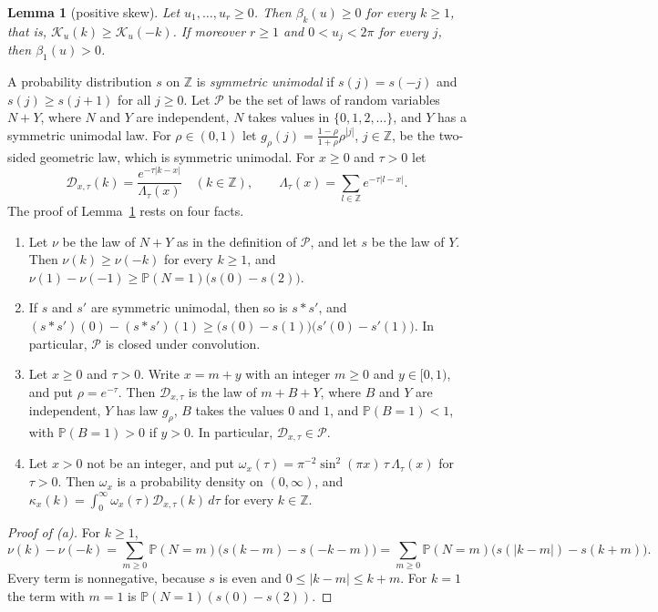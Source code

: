 \documentclass[11pt]{amsart}
\newtheorem{lemma}[theorem]{Lemma}
\theoremstyle{remark}
\numberwithin{equation}{section}
\renewcommand{\P}{\mathbb{P}}
\begin{document}
\begin{lemma}[positive skew]\label{B:lem:skew}
Let $u_1,\dots,u_r\ge0$. Then $\beta_k(u)\ge0$ for every $k\ge1$, that is, $\mathcal K_u(k)\ge\mathcal K_u(-k)$. If moreover $r\ge1$ and $0<u_j<2\pi$ for every $j$, then $\beta_1(u)>0$.
\end{lemma}

A probability distribution $s$ on $\mathbb Z$ is \emph{symmetric unimodal} if $s(j)=s(-j)$ and $s(j)\ge s(j+1)$ for all $j\ge0$. Let $\mathcal P$ be the set of laws of random variables $N+Y$, where $N$ and $Y$ are independent, $N$ takes values in $\{0,1,2,\dots\}$, and $Y$ has a symmetric unimodal law. For $\rho\in(0,1)$ let $g_\rho(j)=\frac{1-\rho}{1+\rho}\rho^{|j|}$, $j\in\mathbb Z$, be the two-sided geometric law, which is symmetric unimodal. For $x\ge0$ and $\tau>0$ let
\[
\mathcal D_{x,\tau}(k)=\frac{e^{-\tau|k-x|}}{\Lambda_\tau(x)}\quad(k\in\mathbb Z),\qquad \Lambda_\tau(x)=\sum_{l\in\mathbb Z}e^{-\tau|l-x|}.
\]
The proof of Lemma~\ref{B:lem:skew} rests on four facts.
\begin{enumerate}[label=(\alph*)]
\item Let $\nu$ be the law of $N+Y$ as in the definition of $\mathcal P$, and let $s$ be the law of $Y$. Then $\nu(k)\ge\nu(-k)$ for every $k\ge1$, and $\nu(1)-\nu(-1)\ge\P(N=1)\bigl(s(0)-s(2)\bigr)$.
\item If $s$ and $s'$ are symmetric unimodal, then so is $s*s'$, and $(s*s')(0)-(s*s')(1)\ge\bigl(s(0)-s(1)\bigr)\bigl(s'(0)-s'(1)\bigr)$. In particular, $\mathcal P$ is closed under convolution.
\item Let $x\ge0$ and $\tau>0$. Write $x=m+y$ with an integer $m\ge0$ and $y\in[0,1)$, and put $\rho=e^{-\tau}$. Then $\mathcal D_{x,\tau}$ is the law of $m+B+Y$, where $B$ and $Y$ are independent, $Y$ has law $g_\rho$, $B$ takes the values $0$ and $1$, and $\P(B=1)<1$, with $\P(B=1)>0$ if $y>0$. In particular, $\mathcal D_{x,\tau}\in\mathcal P$.
\item Let $x>0$ not be an integer, and put $\omega_x(\tau)=\pi^{-2}\sin^2(\pi x)\,\tau\,\Lambda_\tau(x)$ for $\tau>0$. Then $\omega_x$ is a probability density on $(0,\infty)$, and $\kappa_x(k)=\int_0^\infty\omega_x(\tau)\mathcal D_{x,\tau}(k)\,d\tau$ for every $k\in\mathbb Z$.
\end{enumerate}

\begin{proof}[Proof of (a)]
For $k\ge1$,
\[
\nu(k)-\nu(-k)=\sum_{m\ge0}\P(N=m)\bigl(s(k-m)-s(-k-m)\bigr)=\sum_{m\ge0}\P(N=m)\bigl(s(|k-m|)-s(k+m)\bigr).
\]
Every term is nonnegative, because $s$ is even and $0\le|k-m|\le k+m$. For $k=1$ the term with $m=1$ is $\P(N=1)(s(0)-s(2))$.
\end{proof}
\end{document}
